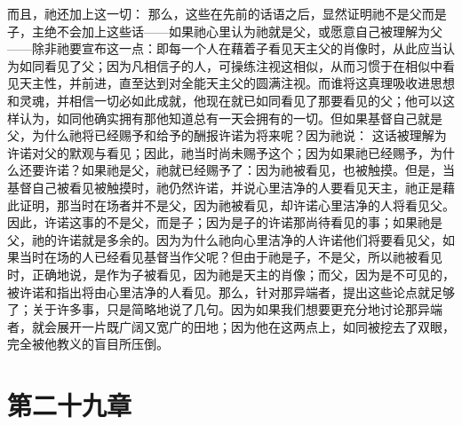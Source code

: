 而且，祂还加上这一切： 那么，这些在先前的话语之后，显然证明祂不是父而是子，主绝不会加上这些话——如果祂心里认为祂就是父，或愿意自己被理解为父——除非祂要宣布这一点：即每一个人在藉着子看见天主父的肖像时，从此应当认为如同看见了父；因为凡相信子的人，可操练注视这相似，从而习惯于在相似中看见天主性，并前进，直至达到对全能天主父的圆满注视。而谁将这真理吸收进思想和灵魂，并相信一切必如此成就，他现在就已如同看见了那要看见的父；他可以这样认为，如同他确实拥有那他知道总有一天会拥有的一切。但如果基督自己就是父，为什么祂将已经赐予和给予的酬报许诺为将来呢？因为祂说： 这话被理解为许诺对父的默观与看见；因此，祂当时尚未赐予这个；因为如果祂已经赐予，为什么还要许诺？如果祂是父，祂就已经赐予了：因为祂被看见，也被触摸。但是，当基督自己被看见被触摸时，祂仍然许诺，并说心里洁净的人要看见天主，祂正是藉此证明，那当时在场者并不是父，因为祂被看见，却许诺心里洁净的人将看见父。因此，许诺这事的不是父，而是子；因为是子的许诺那尚待看见的事；如果祂是父，祂的许诺就是多余的。因为为什么祂向心里洁净的人许诺他们将要看见父，如果当时在场的人已经看见基督当作父呢？但由于祂是子，不是父，所以祂被看见时，正确地说，是作为子被看见，因为祂是天主的肖像；而父，因为是不可见的，被许诺和指出将由心里洁净的人看见。那么，针对那异端者，提出这些论点就足够了；关于许多事，只是简略地说了几句。因为如果我们想要更充分地讨论那异端者，就会展开一片既广阔又宽广的田地；因为他在这两点上，如同被挖去了双眼，完全被他教义的盲目所压倒。\par


\section{第二十九章}

\par

